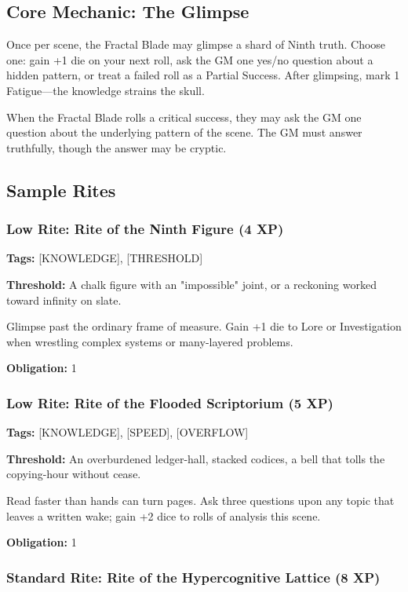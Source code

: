 \subsection{Core Mechanic: The Glimpse}

Once per scene, the Fractal Blade may glimpse a shard of Ninth truth. Choose one: gain +1 die on your next roll, ask the GM one yes/no question about a hidden pattern, or treat a failed roll as a Partial Success. After glimpsing, mark 1 Fatigue—the knowledge strains the skull.

When the Fractal Blade rolls a critical success, they may ask the GM one question about the underlying pattern of the scene. The GM must answer truthfully, though the answer may be cryptic.

\subsection{Sample Rites}

\subsubsection{Low Rite: Rite of the Ninth Figure (4 XP)}

\textbf{Tags:} [KNOWLEDGE], [THRESHOLD]

\textbf{Threshold:} A chalk figure with an "impossible" joint, or a reckoning worked toward infinity on slate.

Glimpse past the ordinary frame of measure. Gain +1 die to Lore or Investigation when wrestling complex systems or many-layered problems.

\textbf{Obligation:} 1

\subsubsection{Low Rite: Rite of the Flooded Scriptorium (5 XP)}

\textbf{Tags:} [KNOWLEDGE], [SPEED], [OVERFLOW]

\textbf{Threshold:} An overburdened ledger-hall, stacked codices, a bell that tolls the copying-hour without cease.

Read faster than hands can turn pages. Ask three questions upon any topic that leaves a written wake; gain +2 dice to rolls of analysis this scene.

\textbf{Obligation:} 1

\subsubsection{Standard Rite: Rite of the Hypercognitive Lattice (8 XP)}

